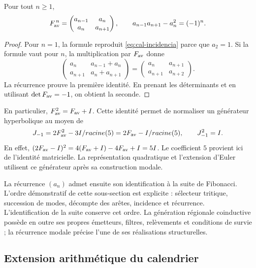 \begin{proposicion}
\label{prop:cal-potencias}
Pour tout $n\geq1$,
\[
 F_{\rm av}^{\,n}=
 \begin{pmatrix}a_{n-1}&a_n\\a_n&a_{n+1}\end{pmatrix},
 \qquad
 a_{n-1}a_{n+1}-a_n^2=(-1)^n.
\]
\end{proposicion}
\begin{proof}
Pour $n=1$, la formule reproduit \eqref{eq:cal-incidencia} parce que
$a_2=1$. Si la formule vaut pour $n$, la multiplication par $F_{\rm av}$
donne
\[
 \begin{pmatrix}
 a_n&a_{n-1}+a_n\\a_{n+1}&a_n+a_{n+1}
 \end{pmatrix}
 =\begin{pmatrix}a_n&a_{n+1}\\a_{n+1}&a_{n+2}\end{pmatrix}.
\]
La récurrence prouve la première identité. En prenant les déterminants et en utilisant
$\det F_{\rm av}=-1$, on obtient la seconde.
\end{proof}

En particulier, $F_{\rm av}^{2}=F_{\rm av}+I$. Cette identité permet de
normaliser un générateur hyperbolique au moyen de
\begin{equation}
 J_{-1}=\frac{2F_{\rm av}^{2}-3I}{\sqrt5}
       =\frac{2F_{\rm av}-I}{\sqrt5},
 \qquad J_{-1}^{2}=I.
 \label{eq:cal-generador-hiperbolico}
\end{equation}
En effet, $(2F_{\rm av}-I)^2=4(F_{\rm av}+I)-4F_{\rm av}+I=5I$.
Le coefficient $5$ provient ici de l’identité matricielle. La représentation
quadratique et l’extension d’Euler utilisent ce générateur après sa
construction modale.

La récurrence $(a_n)$ admet ensuite son identification à la
suite de Fibonacci. L’ordre démonstratif de cette sous-section est explicite :
sélecteur tritique, succession de modes, décompte des arêtes, incidence et
récurrence. L’identification de la suite conserve cet ordre. La
génération régionale coinductive possède en outre ses propres émetteurs, filtres,
relèvements et conditions de survie ; la récurrence modale précise
l’une de ses réalisations structurelles.

\subsection{Extension arithmétique du calendrier}

